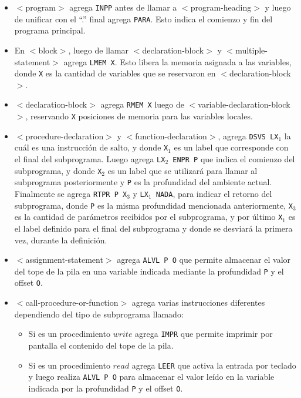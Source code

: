 \begin{itemize}
\item $<$program$>$ agrega \texttt{INPP} antes de llamar a $<$program-heading$>$  y luego de unificar con el ``.'' final agrega \texttt{PARA}. Esto indica el comienzo y fin del programa principal.
\item En $<$block$>$, luego de llamar $<$declaration-block$>$ y $<$multiple-statement$>$ agrega \texttt{LMEM X}. Esto libera la memoria asignada a las variables, donde \texttt{X} es la cantidad de variables que se reservaron en $<$declaration-block$>$.
\item $<$declaration-block$>$ agrega \texttt{RMEM X} luego de $<$variable-declaration-block$>$, reservando  \texttt{X} posiciones de memoria para las variables locales.
\item $<$procedure-declaration$>$ y $<$function-declaration$>$, agrega \texttt{DSVS LX$_{1}$} la cuál es una instrucción de salto, y donde \texttt{X$_{1}$} es un label que corresponde con el final del subprograma. Luego agrega \texttt{LX$_{2}$ ENPR P} que indica el comienzo del subprograma, y donde \texttt{X$_{2}$} es un label que se utilizará para llamar al subprograma posteriormente y \texttt{P} es la profundidad del ambiente actual. Finalmente se agrega \texttt{RTPR P X$_{3}$} y \texttt{LX$_{1}$ NADA}, para indicar el retorno del subprograma, donde \texttt{P} es la misma profundidad mencionada anteriormente, \texttt{X$_{3}$} es la cantidad de parámetros recibidos por el subprograma, y por último \texttt{X$_{1}$} es el label definido para el final del subprograma y donde se desviará la primera vez, durante la definición.
\item $<$assignment-statement$>$ agrega \texttt{ALVL P O} que permite almacenar el valor del tope de la pila en una variable indicada mediante la profundidad \texttt{P} y el offset \texttt{O}.
\item  $<$call-procedure-or-function$>$ agrega varias instrucciones diferentes dependiendo del tipo de subprograma llamado:
\begin{itemize}
	\item Si es un procedimiento $write$ agrega \texttt{IMPR} que permite imprimir por pantalla el contenido del tope de la pila.
	\item Si es un procedimiento $read$ agrega \texttt{LEER} que activa la entrada por teclado y luego realiza \texttt{ALVL P O} para almacenar el valor leído en la variable indicada por la profundidad \texttt{P} y el offset \texttt{O}.

\end{itemize}
\end{itemize}
